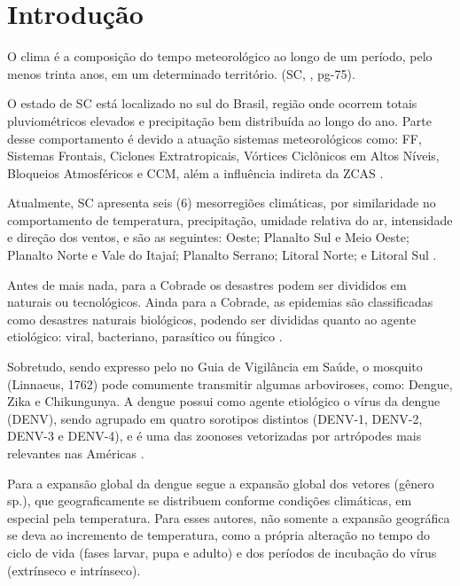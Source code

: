 \chapter{Introdução}

\indent O clima é a composição do tempo meteorológico ao longo de um período, pelo menos trinta anos, em um determinado território. (\acrlong{SC}, \citeyear{AtlasSCnatureza}, pg-75).

\indent O estado de \acrfull{SC} está localizado no sul do Brasil, região onde ocorrem totais pluviométricos elevados e precipitação bem distribuída ao longo do ano. Parte desse comportamento é devido a atuação sistemas meteorológicos como: \acrfull{FF}, Sistemas Frontais, Ciclones Extratropicais, Vórtices Ciclônicos em Altos Níveis, Bloqueios Atmosféricos e \acrfull{CCM}, além a influência indireta da \acrfull{ZCAS} \cite{reboita2010}.

\indent Atualmente, \acrlong{SC} apresenta seis (6) mesorregiões climáticas, por similaridade no comportamento de temperatura, precipitação, umidade relativa do ar, intensidade e direção dos ventos, e são as seguintes: Oeste; Planalto Sul e Meio Oeste; Planalto Norte e Vale do Itajaí; Planalto Serrano; Litoral Norte; e Litoral Sul \cite{Guerra2023Regionalizacao}.

\indent Antes de mais nada, para a \acrfull{Cobrade} os desastres podem ser divididos em naturais ou tecnológicos. Ainda para a \acrshort{Cobrade}, as epidemias são classificadas como desastres naturais biológicos, podendo ser divididas quanto ao agente etiológico: viral, bacteriano, parasítico ou fúngico \cite{GIRD}.

\indent Sobretudo, sendo expresso pelo  no Guia de Vigilância em Saúde, o mosquito  (Linnaeus, 1762) pode comumente transmitir algumas arboviroses, como: Dengue, Zika e Chikungunya. A dengue possui como agente etiológico o vírus da dengue (\acrfull{DENV}), sendo agrupado em quatro sorotipos distintos (\acrshort{DENV}-1, \acrshort{DENV}-2, \acrshort{DENV}-3 e \acrshort{DENV}-4), e é uma das zoonoses vetorizadas por artrópodes mais relevantes nas Américas \cite{GuiaVigSaúde22}.

\indent Para  a expansão global da dengue segue a expansão global dos vetores (gênero  sp.), que geograficamente se distribuem conforme condições climáticas, em especial pela temperatura. Para esses autores, não somente a expansão geográfica se deva ao incremento de temperatura, como a própria alteração no tempo do ciclo de vida (fases larvar, pupa e adulto) e dos períodos de incubação do vírus (extrínseco e intrínseco).

